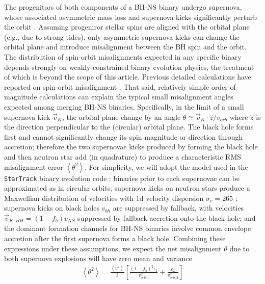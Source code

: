 \documentclass[nofootinbib,twocolumn,prd]{emulateapj}
\newcommand\E[1]{\left<#1\right>}
\begin{document}
The progenitors of both components of a BH-NS binary undergo supernova, whose associated asymmetric mass loss and
supernova kicks significantly perturb the orbit  \citep{2013PhRvD..87j4028G,2002MNRAS.329..897H,2000ApJ...541..319K}.   Assuming progeniror stellar spins are
aligned with the orbital plane (e.g., due to strong tides), only asymmetric supernova kicks can change
the orbital plane and introduce misalignment between the BH spin and the orbit.   The distribution of spin-orbit
misalignments expected in any specific binary depends strongly on weakly-constrained binary evolution physics, the
treatment of which is beyond the scope of this article.  Previous detailed calculations have reported on spin-orbit
misalignment \citep{2010ApJ...719L..79F,2008ApJ...682..474B,2004PhRvD..69j2002G}.  That said, relatively simple order-of-magnitude calculations
can explain the typical small misalignment angles expected among merging BH-NS binaries.
Specifically, in the limit of a small supernova kick $\vec{v}_K$, the orbital plane  change by an angle $\theta \simeq \vec{v}_K \cdot
\hat{z}/v_{orb}$ where $\hat{z}$ is the direction perpendicular to the (circular) orbital plane.  The black hole forms first and cannot
significantly change its spin magnitude or direction through accretion; therefore the two supernovae kicks produced by
forming the black hole and then neutron star add (in quadrature) to produce a characteristic RMS misalignment error
$\E{\theta^2}$.
%
For simplicity, we will adopt the model used in the \texttt{StarTrack} binary evolution code \citep{StarTrack2}: binaries
prior to each supernovae can be approximated as in circular orbits;  supernova kicks on neutron stars produce a Maxwellian
distribution of velocities with 1d velocity dispersion $\sigma_v=265$ \citep{HobbsKicks};  supernova kicks on black holes
$v_{bh}$ are suppressed by fallback, with velocities  $\vec{v}_{K,BH} = (1-f_b)v_{NS}$ suppressed by fallback accretion
onto the black hole; and the dominant formation channels for BH-NS binaries involve common
envelope accretion after the first supernova forms a black hole.   Combining these expressions under these assumptions, we expect the net misalignment  $\theta$ due to both supernova
explosions will have zero mean and variance
\begin{eqnarray}
\label{eq:MisalignmentOrderOfMagnitude}
\E{\theta^2} = \frac{\E{v^2}}{3}\left[ \frac{(1-f_b)^2\epsilon_1}{v_{orb,1}^2}+\frac{\epsilon_2}{v_{orb,2}^2} \right]
\end{eqnarray}
\end{document}
